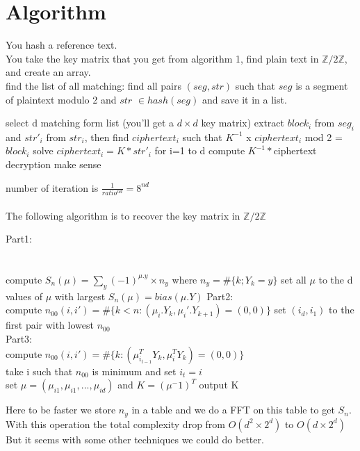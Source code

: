 \documentclass{article}
\begin{document}
\section*{Algorithm}
You hash a reference text.\\
You take the key matrix that you get from algorithm 1, find plain text in $\mathbb{Z}/2\mathbb{Z}$, and create an array.\\
find the list of all matching: find all pairs $(seg,str)$ such that $seg$ is a segment of plaintext modulo 2 and $str$ $\in hash(seg)$ and save it in a list.\\
\begin{algorithmic}[1]
	\REPEAT
\STATE select d matching form list (you'll get a $d\times d$ key matrix)
	\STATE extract $block_{i}$ from $seg_{i}$ and $str'_{i}$ from $str_{i}$,
	\STATE then find $ciphertext_{i}$ such that $K^{-1}$ x $ciphertext_{i}$ mod 2 = $block_{i}$
\ENDFOR
\STATE solve $ciphertext_{i} = K * str'_{i}$ for i=1 to d
\STATE compute $K^{-1} * $ciphertext
\UNTIL decryption make sense
\end{algorithmic}
number of iteration is $ \frac{1}{ratio^{nd}} = 8^{nd}$
\\
\\
The following algorithm is to recover the key matrix in $\mathbb{Z}/2\mathbb{Z}$\\
\begin{algorithmic}[1]
\STATE Part1:\\
\\
\\
\FORALL{$\mu$}
	\STATE compute $S_n(\mu) = \sum_{y}{(-1)^{\mu.y} \times n_y}$ where $n_y=\#\{k;Y_k=y\}$
\ENDFOR
\STATE set all $\mu$ to the d values of $\mu$ with largest $S_n(\mu)=bias(\mu.Y)$
\STATE Part2:\\
	\STATE compute $n_{00}(i,i')=\#\{k<n:(\mu_i .Y_k,\mu_i'.Y_{k+1})=(0,0)\}$
\ENDFOR
\STATE set $(i_d,i_1)$ to the first pair with lowest $n_{00}$
\\
\STATE Part3:\\
		\STATE compute $n_{00}(i,i{'})=\#\{k:(\mu^{T}_{i_{t-1}}Y_{k},\mu^{T}_{i}Y_{k})=(0,0)\}$\\
	\ENDFOR
	\STATE take i such that $n_{00}$ is minimum and set $i_t=i$\\
\ENDFOR
\STATE set $\mu = (\mu_{i1},\mu_{i1},...,\mu_{id})$ and $K=(\mu^-1)^T$
\STATE output K
\end{algorithmic}
Here to be faster we store $n_y$ in a table and we do a FFT on this table to get $S_n$. With this operation the total complexity drop from $O(d^2 \times 2^d)$ to $O(d \times 2^d)$
But it seems with some other techniques we could do better.
\end{document}
